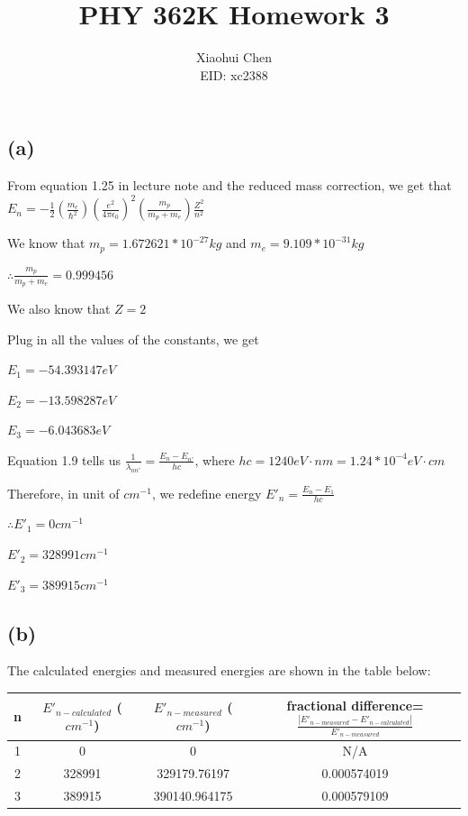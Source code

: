 \documentclass[12pt]{article}
\author{Xiaohui Chen \\EID: xc2388}
\title{PHY 362K Homework 3}
\begin{document}
\maketitle
\begin{spacing}{2.0}

\section{} %

\subsection*{(a)}
From equation 1.25 in lecture note and the reduced mass correction, we get that $E_n=-\frac{1}{2} \left( \frac{m_e}{\hbar^2} \right) \left(\frac{e^2}{4\pi\epsilon_0} \right)^2 \left(\frac{m_p}{m_p+m_e}\right) \frac{Z^2}{n^2}$

We know that $m_p=1.672621*10^{-27} kg$ and $m_e=9.109*10^{-31} kg$

$\therefore \frac{m_p}{m_p+m_e}=0.999456$

We also know that $Z=2$

Plug in all the values of the constants, we get

$\boxed{E_1=-54.393147 eV}$

$\boxed{E_2=-13.598287 eV}$

$\boxed{E_3=-6.043683 eV}$

Equation 1.9 tells us $\frac{1}{\lambda_{nn'}}=\frac{E_n-E_{n'}}{hc}$, where $hc=1240 eV\cdot nm=1.24*10^{-4} eV \cdot cm$

Therefore, in unit of $cm^{-1}$, we redefine energy $E'_n=\frac{E_n-E_{1}}{hc}$

$\therefore \boxed{E'_1=0 cm^{-1}}$

$\boxed{E'_2=328991 cm^{-1}}$

$\boxed{E'_3=389915 cm^{-1}}$

\subsection*{(b)}
The calculated energies and measured energies are shown in the table below:

\begin{tabular}{|c|c|c|c|}
  \hline
  n & $E'_{n-calculated}$ ($cm^{-1}$) & $E'_{n-measured}$ ($cm^{-1}$) & fractional difference=$\frac{|E'_{n-measured}- E'_{n-calculated}|}{E'_{n-measured}}$ \\
  \hline
  1 & 0 & 0 & N/A \\
  \hline
  2 & 328991 & 329179.76197 & 0.000574019 \\
  \hline
  3 & 389915 & 390140.964175 & 0.000579109 \\
  \hline
\end{tabular}


\end{spacing}
\end{document}

